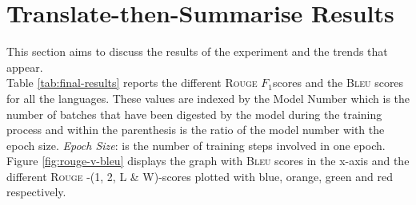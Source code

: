 \documentclass[12pt,a4paper,twoside,openright]{report}
\newcommand{\bleu}{\textsc{Bleu} }
\newcommand{\rouge}{\textsc{Rouge} }
\newcommand{\fone}{$F_1$}
\begin{document}
\section{Translate-then-Summarise Results}
\label{translate-then-summarize}
This section aims to discuss the results of the experiment and the trends that appear.
\\
Table \ref{tab:final-results} reports the different \rouge \fone scores and the \bleu scores for all the languages. These values are indexed by the Model Number which is the number of batches that have been digested by the model during the training process and within the parenthesis is the ratio of the model number with the epoch size. {\textit{Epoch Size}: is the number of training steps involved in one epoch.}
\\
Figure \ref{fig:rouge-v-bleu} displays the graph with \bleu scores in the x-axis and the different \rouge-(1, 2, L \&  W)-scores plotted with blue, orange, green and red respectively.
\end{document}
